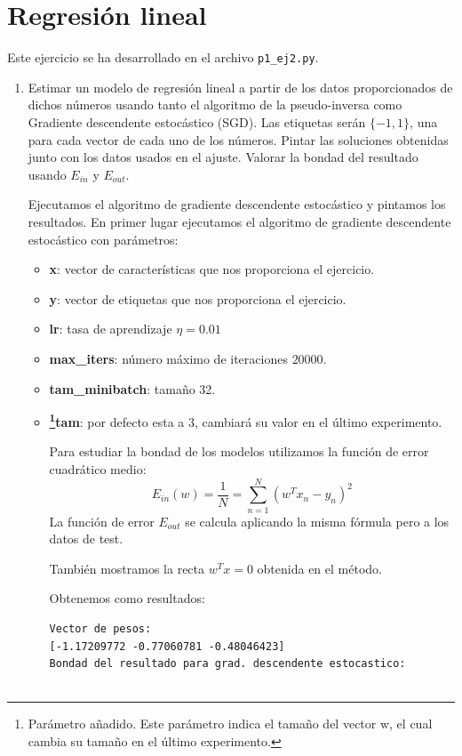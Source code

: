 \documentclass[size=a4, parskip=half, titlepage=false, toc=flat, toc=bib, 12pt]{scrartcl}
\begin{document}
\section{Regresión lineal}
Este ejercicio se ha desarrollado en el archivo \verb|p1_ej2.py|.
\begin{enumerate}

\item Estimar un modelo de regresión lineal a partir de los datos proporcionados de
dichos números usando tanto el algoritmo de la pseudo-inversa como Gradiente descendente
estocástico (SGD). Las etiquetas serán $\{−1, 1\}$, una para cada vector de cada uno de los
números. Pintar las soluciones obtenidas junto con los datos usados en el ajuste. Valorar
la bondad del resultado usando $E_{in}$ y $E_{out}$.

Ejecutamos el algoritmo de gradiente descendente estocástico y pintamos los resultados.
En primer lugar ejecutamos el algoritmo de gradiente descendente estocástico con parámetros:
\begin{itemize}
\item \textbf{x}: vector de características que nos proporciona el ejercicio.
\item \textbf{y}: vector de etiquetas que nos proporciona el ejercicio.
\item \textbf{lr}: tasa de aprendizaje $\eta = 0.01$
\item \textbf{max\_iters}: número máximo de iteraciones $20000$.
\item \textbf{tam\_minibatch}: tamaño 32.
\item \textbf{\footnote{Parámetro añadido. Este parámetro indica el tamaño del vector w,
el cual cambia su tamaño en el último experimento.}{tam}}: por defecto esta a 3, cambiará
su valor en el último experimento.

Para estudiar la bondad de los modelos utilizamos la función de error cuadrático medio:
$$E_{in}(w) = \frac{1}{N} = \sum_{n=1}^N (w^T x_n - y_n)^2 $$
La función de error $E_{out}$ se calcula aplicando la misma fórmula pero a los datos de test.

También mostramos la recta $w^T x = 0$ obtenida en el método.

Obtenemos como resultados:
\begin{lstlisting}
Vector de pesos:
[-1.17209772 -0.77060781 -0.48046423]
Bondad del resultado para grad. descendente estocastico:


\end{lstlisting}
\end{itemize}
\end{enumerate}
\end{document}
